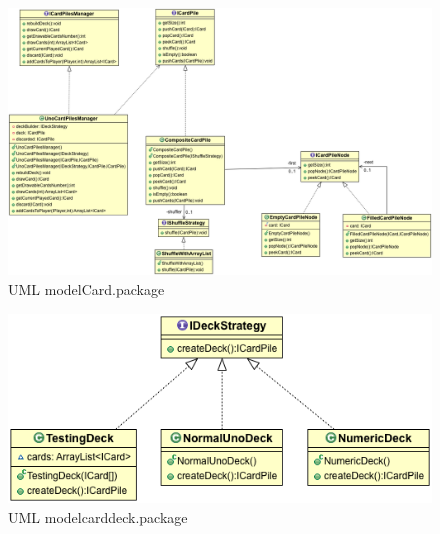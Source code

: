 \documentclass[letterpaper,11pt]{article}
\begin{document}
\begin{figure}[H]
\center
\includegraphics[scale=0.17]{modelCard.png}
\caption{UML modelCard.package}
\end{figure}

\begin{figure}[H]
\center
\includegraphics[scale=0.17]{modelcarddeck.png}
\caption{UML modelcarddeck.package}
\end{figure}
\end{document}
